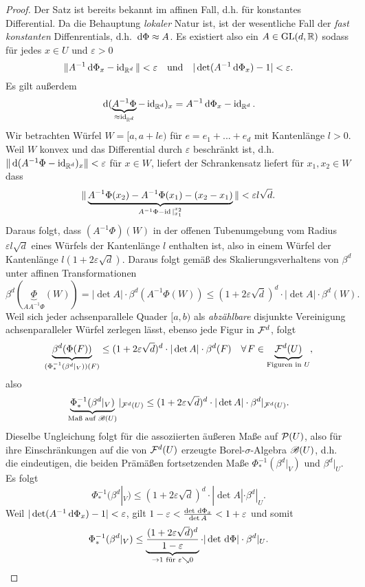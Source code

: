 \begin{satz}
\begin{proof}
Der Satz ist bereits bekannt im affinen Fall, d.h. für konstantes Differential. Da die Behauptung \emph{lokaler} Natur ist, ist der wesentliche Fall der \emph{fast konstanten} Diffenrentials, d.h. $\, \mathrm{d} \Phi \approx A$. Es existiert also ein $A\in \operatorname{GL}(d,\mathbb{R})$ sodass für jedes $x\in U$ und $\varepsilon>0$
$$\|A^{-1}\, \mathrm{d}\Phi_x - \operatorname{id}_{\mathbb{R}^d}\| < \varepsilon	\ \  \text{ und }  \ \ |\det(A^{-1}\, \mathrm{d}\Phi_x)-1| < \varepsilon.$$
Es gilt außerdem
$$\, \mathrm{d} (\underbrace{A^{-1}\Phi}_{\approx \operatorname{id}_{\mathbb{R}^d}} -\operatorname{id}_{\mathbb{R}^d})_x = A^{-1}\, \mathrm{d} \Phi_x-\operatorname{id}_{\mathbb{R}^d}.$$
Wir betrachten Würfel $W=[a,a+le)$ für $e=e_1+...+e_d$ mit Kantenlänge $l>0$. 
Weil $W$ konvex und das Differential durch $\varepsilon$ beschränkt ist, d.h. $\|\, \mathrm{d} (A^{-1}\Phi - \operatorname{id}_{\mathbb{R}^d})_x\|<\varepsilon$ für $x\in W$, liefert der Schrankensatz liefert für $x_1,x_2 \in W$ dass
$$
\|	\underbrace{A^{-1}\Phi(x_2)-A^{-1}\Phi(x_1)-(x_2-x_1)}_{A^{-1}\Phi-\operatorname{id}|_{x_1}^{x_2}}		\| < \varepsilon l \sqrt{d}.
$$
Daraus folgt, dass $(A^{-1}\Phi)(W)$ in der offenen Tubenumgebung vom Radius $\varepsilon l \sqrt{d}$ eines Würfels der Kantenlänge $l$ enthalten ist, also in einem Würfel der Kantenlänge $l(1+2\varepsilon\sqrt{d})$.
Daraus folgt gemäß des Skalierungsverhaltens von $\beta^d$ unter affinen Transformationen
$$\beta^d(\underbrace{\Phi}_{AA^{-1}\Phi}(W))=|\det A| \cdot \beta^d (A^{-1}\Phi(W)) \leq (1+2\varepsilon\sqrt{d})^d\cdot |\det A|\cdot \beta^d(W).$$
Weil sich jeder achsenparallele Quader $[a,b)$ als \emph{abzählbare} disjunkte Vereinigung achsenparalleler Würfel zerlegen lässt, ebenso jede Figur in $\mathcal{F}^d$, folgt
$$
\underbrace{\beta^d(\Phi(F))}_{(\Phi^{-1}_*(\beta^d|_V))(F)} \leq (1+2\varepsilon\sqrt{d})^d \cdot |\det A| \cdot \beta^d(F)\quad \forall F\in \underbrace{\FF^d(U)}_{\te{Figuren in } U},
$$
also
$$
\underbrace{\Phi^{-1}_*(\beta^d|_V)}_{\text{Maß auf }\mathscr{B}(U)}|_{\mathcal{F}^d(U)} \leq (1+2\varepsilon\sqrt{d})^d \cdot |\det A| \cdot \beta^d|_{\mathcal{F}^d(U)}.
$$
Dieselbe Ungleichung folgt für die assoziierten äußeren Maße auf $\mathcal{P}(U)$, also für ihre Einschränkungen auf die von $\mathcal{F}^d(U)$ erzeugte Borel-$\sigma$-Algebra $\mathscr{B}(U)$, d.h. die eindeutigen, die beiden Prämäßen fortsetzenden Maße $\Phi^{-1}_*(\beta^d|_V)$ und $\beta^d|_U$. Es folgt
$$\Phi^{-1}_*(\beta^d|_V)\leq (1+2\varepsilon\sqrt{d})^d\cdot |\det A| \cdot \beta^d|_U.$$
Weil $|\det (A^{-1} \, \mathrm{d} \Phi_x)-1|<\varepsilon$, gilt $1-\varepsilon < \frac{\det \, \mathrm{d}\Phi_x}{\det A}<1+\varepsilon$ und somit
\begin{equation}\label{transf,leq}
\Phi^{-1}_*(\beta^d|_V)\leq \underbrace{\frac{(1+2\varepsilon\sqrt{d})^d}{1-\varepsilon}}_{\to 1 \te{ für }\varepsilon \searrow 0} \cdot |\det \D \Phi| \cdot \beta^d|_U.

\end{equation}
\end{proof}
\end{satz}
